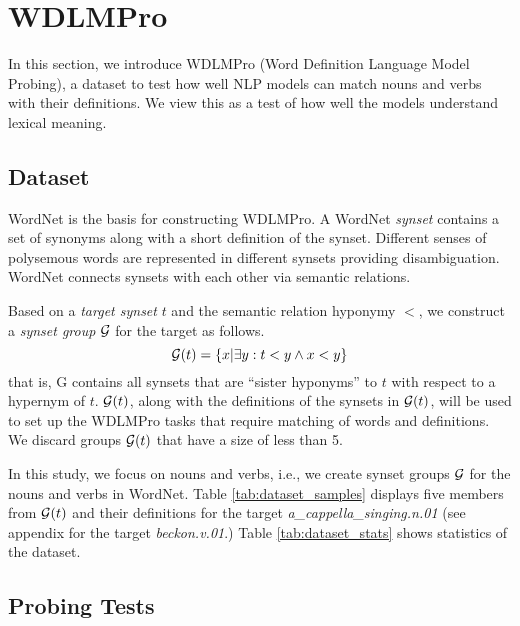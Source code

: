 \documentclass[11pt,a4paper]{article}
\begin{document}
\section{WDLMPro}
In this section,
we introduce  WDLMPro (Word Definition Language Model
Probing), a dataset to test how well NLP models can match
nouns and verbs with  their
definitions.
We view this as a test of how well the models understand lexical meaning.

\subsection{Dataset}
WordNet \cite{miller95wordnet} is the basis for
constructing WDLMPro.  A WordNet \textit{synset} contains a
set of synonyms along with a short definition of
the synset.  Different senses of polysemous words are
represented in different synsets providing
disambiguation. WordNet connects synsets with each other via
semantic relations.

Based on a \emph{target synset}
$t$ and the semantic relation hyponymy $<$, we construct
a \emph{synset group} $\cal G$ for the target as follows.
\[
  {\cal G}(t) = \{ x | \exists y: t<y \wedge x<y \}
  \]
that is, {\cal G} contains all synsets that are ``sister
hyponyms'' to $t$ with respect to a hypernym of $t$.
${\cal G}(t)$, along with the definitions of the synsets in
${\cal G}(t)$,
will be used to
set up the WDLMPro tasks that require matching of words and definitions.
We discard groups ${\cal G}(t)$ that
have a size of less than 5.


In this study, we focus on nouns and verbs, i.e., we create
synset groups ${\cal G}$ for the nouns and verbs in WordNet.
Table
\ref{tab:dataset_samples} displays five members from ${\cal
  G} (t)$ 
and their definitions
for the target
\emph{a\_cappella\_singing.n.01} (see appendix for the target \emph{beckon.v.01}.)
Table \ref{tab:dataset_stats} shows statistics of the dataset.
  


\subsection{Probing Tests}
\end{document}
